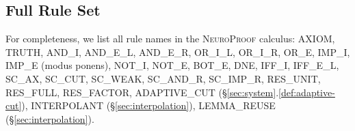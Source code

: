 \documentclass[conference]{IEEEtran}
\newcommand{\NP}{\textsc{NeuroProof}}
\begin{document}
\subsection{Full Rule Set}

For completeness, we list all rule names in the \NP{} calculus:
AXIOM, TRUTH, AND\_I, AND\_E\_L, AND\_E\_R, OR\_I\_L, OR\_I\_R, OR\_E,
IMP\_I, IMP\_E (modus ponens), NOT\_I, NOT\_E, BOT\_E, DNE, IFF\_I,
IFF\_E\_L, SC\_AX, SC\_CUT, SC\_WEAK, SC\_AND\_R, SC\_IMP\_R,
RES\_UNIT, RES\_FULL, RES\_FACTOR,
ADAPTIVE\_CUT (§\ref{sec:system}.\ref{def:adaptive-cut}),
INTERPOLANT (§\ref{sec:interpolation}),
LEMMA\_REUSE (§\ref{sec:interpolation}).
\end{document}

